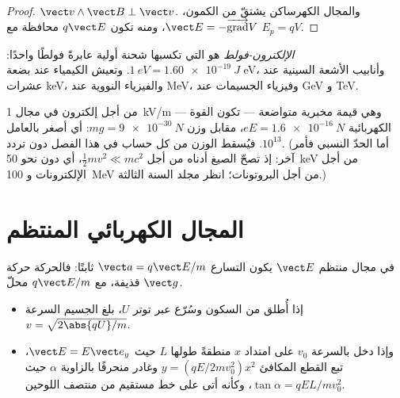 \begin{proof}
$\vect v\wedge\vect B \perp \vect v$. والمجال الكهرساكن يشتقّ من
الكمون، $\vect E = -\overrightarrow{\operatorname{grad}}V$، ومنه تكون $q\vect E$
محافظة مع $E_p = qV$.
\end{proof}

\begin{definition}\label{def:b1:charged-particles:eV}
\emph{الإلكترون-فولط} هو  التي تكسبها شحنة
أولية عابرةً فولطًا واحدًا: $\qty{1}{eV} = \qty{1.60e-19}{J}$. وتعيش الكيمياء
عند بضعة \unit{eV}، وأنابيب الأشعة السينية عند عشرات \unit{keV}،
والفيزياء النووية عند \unit{MeV}، وفيزياء الجسيمات عند \unit{GeV} و \unit{TeV}.
\end{definition}

\begin{remark}\label{rem:b1:charged-particles:gravity}
من أجل إلكترون في مجال \qty{1}{kV/m} --- وهي قيمة مخبرية
متواضعة --- تكون القوة الكهربائية $eE = \qty{1.6e-16}{N}$، مقابل وزن
$mg = \qty{9e-30}{N}$: أي أصغر بالعامل $10^{13}$. فيُسقط الوزن من
كل حساب في هذا الفصل دون تردد. (أما
الحدّ النسبي فأمر آخر: إذ تصحّ الصيغ أدناه من أجل
$\tfrac12 mv^2 \ll mc^2$، أي دون نحو \qty{50}{keV} من أجل الإلكترونات
و \qty{100}{MeV} من أجل البروتونات؛ انظر مجلد السنة الثالثة.)
\end{remark}

\section{المجال الكهربائي المنتظم}

\begin{proposition}\label{prop:b1:charged-particles:efield}
في مجال منتظم $\vect E$ يكون التسارع $\vect a = q\vect E/m$
ثابتًا: فالحركة حركة قذيفة، مع $q\vect E/m$ محلّ
$\vect g$.
\begin{itemize}
  \item إذا أُطلق من السكون وسُرّع عبر توتر $U$، بلغ
        الجسيم السرعة $v = \sqrt{2\abs{qU}/m}$.
  \item وإذا دخل بالسرعة $v_0$ على امتداد $x$ منطقةً طولها $L$ حيث
        $\vect E = E\vect e_y$، تبع القطع المكافئ $y = (qE/2mv_0^2)x^2$
        وغادر منحرفًا بالزاوية $\alpha$ حيث $\tan\alpha =
        qEL/mv_0^2$، وكأنه أتى على خط مستقيم من
        منتصف اللوحين.
\end{itemize}
\end{proposition}


